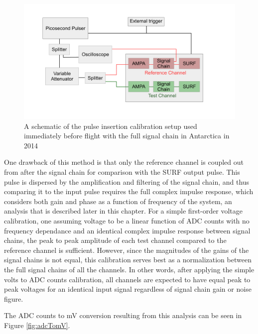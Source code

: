 			
	\begin{figure}
		\includegraphics[width=\textwidth]{figures/antarctica14_calSetup}
		\caption{A schematic of the pulse insertion calibration setup used immediately before flight with the full signal chain in Antarctica in 2014}
		\label{fig:calSetup}
	\end{figure}
		
	One drawback of this method is that only the reference channel is coupled out from after the signal chain for comparison with the SURF output pulse.  This pulse is dispersed by the amplification and filtering of the signal chain, and thus comparing it to the input pulse requires the full complex impulse response, which considers both gain and phase as a function of frequency of the system, an analysis that is described later in this chapter.  For a simple first-order voltage calibration, one assuming voltage to be a linear function of ADC counts with no frequency dependance and an identical complex impulse response between signal chains, the peak to peak amplitude of each test channel compared to the reference channel is sufficient.  However, since the magnitudes of the gains of the signal chains is not equal, this calibration serves best as a normalization between the full signal chains of all the channels.  In other words, after applying the simple volts to ADC counts calibration, all channels are expected to have equal peak to peak voltages for an identical input signal regardless of signal chain gain or noise figure.
		
	The ADC counts to mV conversion resulting from this analysis can be seen in Figure \ref{fig:adcTomV}.


